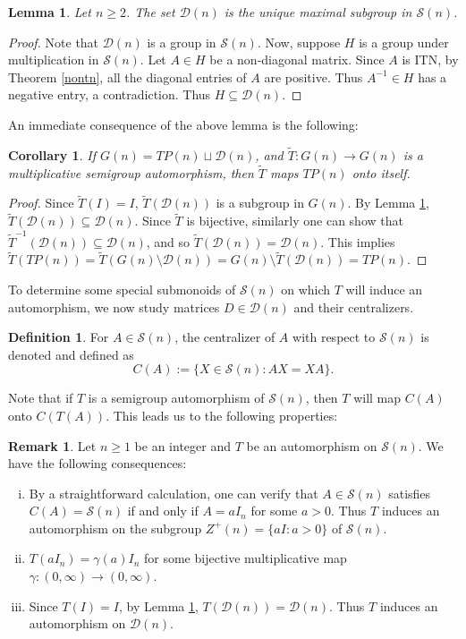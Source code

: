 \documentclass[11pt,reqno]{amsart}
\theoremstyle{plain}
\newtheorem{lemma}[theorem]{Lemma}
\newtheorem{cor}[theorem]{Corollary}
\theoremstyle{definition}
\newtheorem{defn}[theorem]{Definition}
\newtheorem{rem}[theorem]{Remark}
\numberwithin{equation}{section}
\def\cS{\mathcal S}
\def\cD{\mathcal D}
\begin{document}
\begin{lemma} \label{groupd}
	Let $n\geq 2$. The set $\cD(n)$ is the unique maximal subgroup in $\cS(n)$.
\end{lemma}

\begin{proof}
Note that $\cD(n)$ is a group in $\cS(n)$.  Now, suppose $H$ is a group under multiplication in $\cS(n)$. Let $A\in H$ be a non-diagonal matrix.  Since $A$ is ITN, by Theorem \ref{nontn}, all the diagonal entries of $A$ are positive. Thus $A^{-1} \in H$ has a negative entry, a contradiction. Thus $H\subseteq \cD(n)$.
\end{proof}
An immediate consequence of the above lemma is the following:
\begin{cor}\label{corpnc3.3}
	If $G(n) = TP(n) \sqcup \mathcal{D}(n)$, and $\tilde{T} : G(n) \to G(n)$ is a multiplicative semigroup automorphism, then $\tilde{T}$ maps $TP(n)$ onto itself.
\end{cor}
\begin{proof}
	Since $\tilde{T}(I)=I$, $\tilde{T}(\cD(n))$ is a subgroup in $G(n)$. By Lemma \ref{groupd}, $\tilde{T}(\cD(n))\subseteq \cD(n)$. Since $\tilde{T}$ is bijective,  similarly one can show that $\tilde{T}^{-1}(\cD(n))\subseteq \cD(n)$,  and  so $\tilde{T}(\cD(n))= \cD(n)$. This implies $\tilde{T}(TP(n))=\tilde T \left(G(n)\setminus \cD(n)\right)=G(n)\setminus \tilde T(\cD(n))= TP(n)$.
\end{proof}

To determine some special submonoids of $\cS(n)$ on which $T$ will induce an automorphism, we now study matrices $D\in \cD(n)$ and their centralizers.

\begin{defn}
For $A \in \cS(n)$, the centralizer of $A$ with respect to $\cS(n)$ is denoted and defined as
\[C(A):= \{X \in \cS(n): AX = XA\}.\]

\end{defn}
Note that if $T$ is a semigroup automorphism of $\cS(n)$, then $T$ will map $C(A)$ onto $C(T(A))$. This leads us to the following properties: 

\begin{rem}\label{rem1}
	Let $n\geq 1$ be an integer and $T$ be an automorphism on $\cS(n)$. We have the following consequences:
	\begin{enumerate}[(i)]
		\item By a straightforward calculation, one can verify that $A \in \cS(n)$ satisfies $C(A) = \cS(n)$ if and only if $A = aI_n$ for some $a > 0$. Thus $T$ induces an automorphism on the subgroup $Z^+(n) = \{aI: a> 0\}$ of $\cS(n)$.
		\item $T(aI_n) = \gamma(a)I_n$ for some bijective multiplicative map $\gamma: (0, \infty) \rightarrow (0,\infty)$.
		\item Since $T(I)=I$, by Lemma \ref{groupd}, $T(\cD(n))=\cD(n)$. Thus $T$ induces an automorphism on $\cD(n)$.
	\end{enumerate}
\end{rem}
\end{document}
